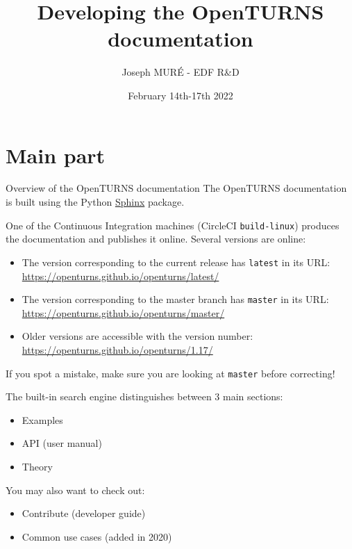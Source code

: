 \documentclass[8pt, handout]{beamer}
\title{Developing the OpenTURNS documentation}
\author{Joseph MUR\'E - EDF R\&D}
\date{February 14th-17th 2022}
\institute{\small OpenTURNS Consortium}
\begin{document}
\frame{\titlepage}

\part{Main part}


\begin{frame}{Overview of the OpenTURNS documentation}
The OpenTURNS documentation is built using the Python \href{https://www.sphinx-doc.org/en/master/index.html}{\alert{Sphinx}} package.

One of the Continuous Integration machines (CircleCI \texttt{build-linux})
produces the documentation and publishes it online.
Several versions are online:

\begin{itemize}
\item The version corresponding to the current release has \alert{\texttt{latest}} in its URL:
\url{https://openturns.github.io/openturns/latest/}
\item The version corresponding to the master branch has \alert{\texttt{master}} in its URL:
\url{https://openturns.github.io/openturns/master/}
\item Older versions are accessible with the version number: \url{https://openturns.github.io/openturns/1.17/}
\end{itemize}

If you spot a mistake, make sure you are looking at \texttt{master} before correcting!

The built-in search engine distinguishes between 3 main sections:

\begin{itemize}
    \item \alert{Examples}
    \item \alert{API} (user manual)
    \item \alert{Theory}
\end{itemize}

You may also want to check out:

\begin{itemize}
    \item \alert{Contribute} (developer guide)
    \item \alert{Common use cases} (added in 2020)
\end{itemize}
\end{frame}
\end{document}
